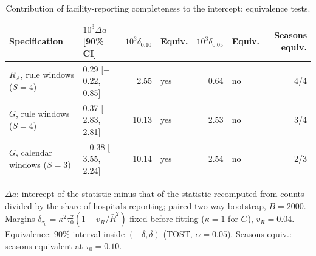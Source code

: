 \begin{table}[htbp]
\centering
\footnotesize
\caption{Contribution of facility-reporting completeness to the intercept: equivalence tests.}
\label{tab:s3}
\begin{tabular}{llrlrlr}
\toprule
Specification & $10^3\Delta a$ [90\% CI] & $10^3\delta_{0.10}$ & Equiv. & $10^3\delta_{0.05}$ & Equiv. & Seasons equiv. \\
\midrule
$R_A$, rule windows ($S=4$) & 0.29 [$-$0.22, 0.85] & 2.55 & yes & 0.64 & no & 4/4 \\
$G$, rule windows ($S=4$) & 0.37 [$-$2.83, 2.81] & 10.13 & yes & 2.53 & no & 3/4 \\
$G$, calendar windows ($S=3$) & $-$0.38 [$-$3.55, 2.24] & 10.14 & yes & 2.54 & no & 2/3 \\
\bottomrule
\end{tabular}
\par\smallskip
\begin{minipage}{0.95\linewidth}\scriptsize $\Delta a$: intercept of the statistic minus that of the statistic recomputed from counts divided by the share of hospitals reporting; paired two-way bootstrap, $B=2000$. Margins $\delta_{\tau_0}=\kappa^2\tau_0^2(1+v_R/\bar{R}^2)$ fixed before fitting ($\kappa=1$ for $G$), $v_R=0.04$. Equivalence: 90\% interval inside $(-\delta,\delta)$ (TOST, $\alpha=0.05$). Seasons equiv.: seasons equivalent at $\tau_0=0.10$.\end{minipage}
\end{table}
